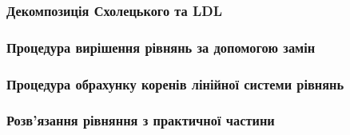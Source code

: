 \subsubsection*{Декомпозиція Схолецького та LDL}


\subsubsection*{Процедура вирішення рівнянь за допомогою замін}


\subsubsection*{Процедура обрахунку коренів лінійної системи рівнянь}


\subsubsection*{Розв'язання рівняння з практичної частини}

